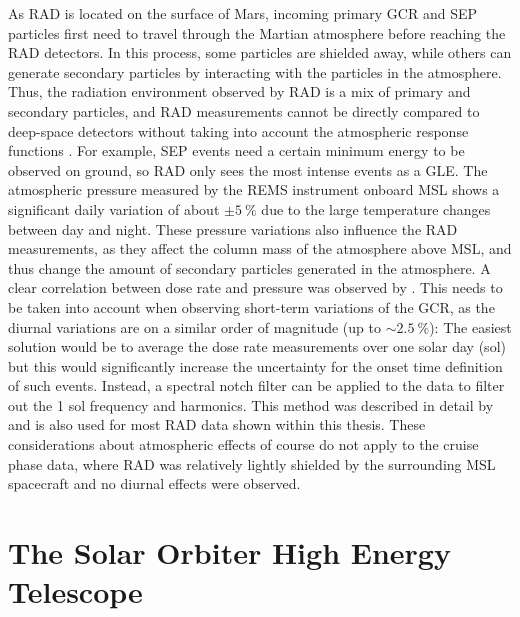 As \ac{RAD} is located on the surface of Mars, incoming primary \ac{GCR} and \ac{SEP} particles first need to travel through the Martian atmosphere before reaching the \ac{RAD} detectors. In this process, some particles are shielded away, while others can generate secondary particles by interacting with the particles in the atmosphere. Thus, the radiation environment observed by \ac{RAD} is a mix of primary and secondary particles, and \ac{RAD} measurements cannot be directly compared to deep-space detectors without taking into account the atmospheric response functions \citep[see e.g.][]{Guo-2017,Guo-2019}. For example, \ac{SEP} events need a certain minimum energy to be observed on ground, so \ac{RAD} only sees the most intense events as a \ac{GLE}.
The atmospheric pressure measured by the \ac{REMS} instrument onboard \ac{MSL} shows a significant daily variation of about $\pm\SI{5}{\percent}$ \citep{Haberle-2014} due to the large temperature changes between day and night. These pressure variations also influence the \ac{RAD} measurements, as they affect the column mass of the atmosphere above \ac{MSL}, and thus change the amount of secondary particles generated in the atmosphere. A clear correlation between dose rate and pressure was observed by \citet{Guo-2017}. This needs to be taken into account when observing short-term variations of the \ac{GCR}, as the diurnal variations are on a similar order of magnitude (up to $\sim\SI{2.5}{\percent}$): The easiest solution would be to average the dose rate measurements over one solar day (sol) but this would significantly increase the uncertainty for the onset time definition of such events. Instead, a spectral notch filter can be applied to the data to filter out the 1 sol frequency and harmonics. This method was described in detail by \citet{Guo-2017-maven} and is also used for most \ac{RAD} data shown within this thesis.
These considerations about atmospheric effects of course do not apply to the cruise phase data, where \ac{RAD} was relatively lightly shielded by the surrounding \ac{MSL} spacecraft \citep{Zeitlin-2013-cruise,guo2015cruise} and no diurnal effects were observed.

\section{The Solar Orbiter High Energy Telescope}
\label{sec:solohet}

